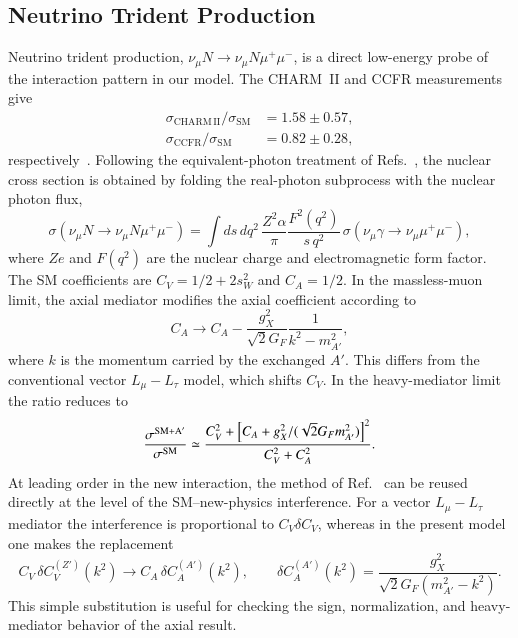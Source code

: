 \documentclass[onecolumn, aps, nofootinbib, prd, preprint, floats, floatfix, amsmath, amssymb, superscriptaddress, preprintnumbers]{revtex4-2}
\begin{document}
\subsection{Neutrino Trident Production}
\label{subsec:trident}
Neutrino trident production, $\nu_\mu N\to \nu_\mu N\mu^+\mu^-$, is a direct low-energy probe of the interaction pattern in our model. The CHARM~II and CCFR measurements give
\begin{equation}
\begin{aligned}
\sigma_{\mathrm{CHARM\,II}}/\sigma_{\mathrm{SM}}&=1.58\pm0.57,\\
\sigma_{\mathrm{CCFR}}/\sigma_{\mathrm{SM}}&=0.82\pm0.28,
\end{aligned}
\end{equation}
respectively~\cite{geiregat1990first,CCFR:1991lpl}. Following the equivalent-photon treatment of Refs.~\cite{Williams:1934ad,Belusevic:1987cw,Altmannshofer:2014pba}, the nuclear cross section is obtained by folding the real-photon subprocess with the nuclear photon flux,
\begin{equation}
\sigma(\nu_\mu N\to\nu_\mu N\mu^+\mu^-)
=\int ds\,dq^2\,
\frac{Z^2\alpha}{\pi}\frac{F^2(q^2)}{s\,q^2}\,
\sigma(\nu_\mu\gamma\to\nu_\mu\mu^+\mu^-),
\label{eq:trident-epa}
\end{equation}
where $Ze$ and $F(q^2)$ are the nuclear charge and electromagnetic form factor. The SM coefficients are $C_V=1/2+2s_W^2$ and $C_A=1/2$. In the massless-muon limit, the axial mediator modifies the axial coefficient according to
\begin{equation}
C_A\longrightarrow C_A-\frac{g_X^2}{\sqrt2G_F}\frac{1}{k^2-m_{A'}^2},
\end{equation}
where $k$ is the momentum carried by the exchanged $A'$. This differs from the conventional vector $L_\mu-L_\tau$ model, which shifts $C_V$. In the heavy-mediator limit the ratio reduces to
\begin{equation}
\frac{\sigma^{\rm SM+A'}}{\sigma^{\rm SM}}
\simeq
\frac{C_V^2+\left[C_A+g_X^2/(\sqrt2G_Fm_{A'}^2)\right]^2}
{C_V^2+C_A^2}.
\end{equation}
At leading order in the new interaction, the method of Ref.~\cite{Altmannshofer:2014pba} can be reused directly at the level of the SM--new-physics interference. For a vector $L_\mu-L_\tau$ mediator the interference is proportional to $C_V\delta C_V$, whereas in the present model one makes the replacement
\begin{equation}
C_V\,\delta C_V^{(Z')}(k^2)
\longrightarrow
C_A\,\delta C_A^{(A')}(k^2),
\qquad
\delta C_A^{(A')}(k^2)=
\frac{g_X^2}{\sqrt2G_F\left(m_{A'}^2-k^2\right)}.
\label{eq:trident-leading-substitution}
\end{equation}
This simple substitution is useful for checking the sign, normalization, and heavy-mediator behavior of the axial result.
\end{document}
